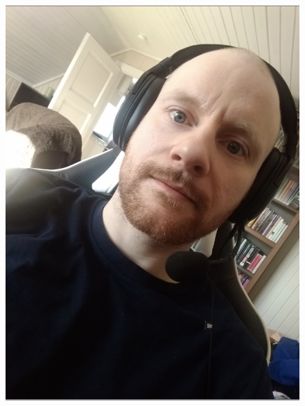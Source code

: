 \begin{figure}[h]
        {\includegraphics[scale = 0.2]{figures/0367.png}\hspace{0.4cm}}
    \subfloat

\end{figure}
